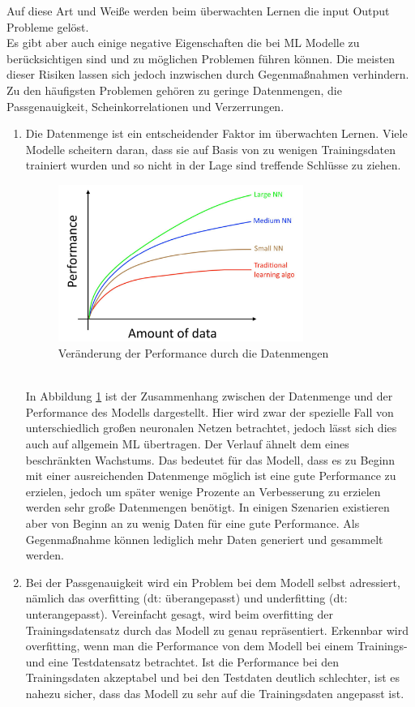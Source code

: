 \begin{onehalfspace}
        Auf diese Art und Weiße werden beim überwachten Lernen die input Output Probleme gelöst.\cite{Ng2018}
        \\
        Es gibt aber auch einige negative Eigenschaften die bei \ac{ML} Modelle zu berücksichtigen sind und zu möglichen Problemen führen können. Die meisten dieser Risiken lassen sich jedoch inzwischen durch Gegenmaßnahmen verhindern. Zu den häufigsten Problemen gehören zu geringe Datenmengen, die Passgenauigkeit, Scheinkorrelationen und Verzerrungen. 
        \begin{enumerate}
            \item Die Datenmenge ist ein entscheidender Faktor im überwachten Lernen. Viele Modelle scheitern daran, dass sie auf Basis von zu wenigen Trainingsdaten trainiert wurden und so nicht in der Lage sind treffende Schlüsse zu ziehen.\cite{Datenkommission2019}\cite{Ng2018}
            \begin{figure}[h]
                \centering
                \includegraphics[width = 8cm]{Bilder/Datenmenge.png}
                \caption{Veränderung der Performance durch die Datenmengen \cite{Ng2018}}
                \label{fig:Datavolume}
            \end{figure}\\
            In Abbildung \ref*{fig:Datavolume} ist der Zusammenhang zwischen der Datenmenge und der Performance des Modells dargestellt. Hier wird zwar der spezielle Fall von unterschiedlich großen neuronalen Netzen betrachtet, jedoch lässt sich dies auch auf allgemein \ac*{ML} übertragen. Der Verlauf ähnelt dem eines beschränkten Wachstums. Das bedeutet für das Modell, dass es zu Beginn mit einer ausreichenden Datenmenge möglich ist eine gute Performance zu erzielen, jedoch um später wenige Prozente an Verbesserung zu erzielen werden sehr große Datenmengen benötigt.\cite{Ng2018} In einigen Szenarien existieren aber von Beginn an zu wenig Daten für eine gute Performance. Als Gegenmaßnahme können lediglich mehr Daten generiert und gesammelt werden.
            \item Bei der Passgenauigkeit wird ein Problem bei dem Modell selbst adressiert, nämlich das overfitting (\ac*{dt}: \glqq{}überangepasst\grqq{}) und underfitting (\ac*{dt}: \glqq{}unterangepasst\grqq{}). Vereinfacht gesagt, wird beim overfitting der Trainingsdatensatz durch das Modell zu genau repräsentiert. Erkennbar wird overfitting, wenn man die Performance von dem Modell bei einem Trainings- und eine Testdatensatz betrachtet. Ist die Performance bei den Trainingsdaten akzeptabel und bei den Testdaten deutlich schlechter, ist es nahezu sicher, dass das Modell zu sehr auf die Trainingsdaten angepasst ist.

\end{enumerate}
\end{onehalfspace}
